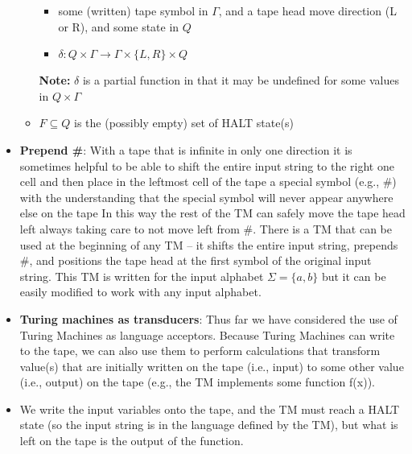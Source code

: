 \documentclass{report}
\begin{document}
\begin{itemize}
\begin{itemize}
\begin{itemize}
                        \item some (written) tape symbol in $\Gamma$, and a tape head move direction (L or R), and some state in $Q$
                        \item $\delta: Q \times \Gamma\to \Gamma \times \{L,R\} \times Q $
                    \end{itemize}
                    \bigbreak \noindent 
                    \textbf{Note:} $\delta$ is a partial function in that it may be undefined for some values in $Q \times \Gamma$
                \item $F \subseteq Q$ is the (possibly empty) set of HALT state(s)

            \end{itemize}
        \item \textbf{Prepend \#}: With a tape that is infinite in only one direction it is sometimes helpful to be able to shift the entire input string to the right one cell and then place in the leftmost cell of the tape a special symbol (e.g., \#) with the understanding that the special symbol will never appear anywhere else on the tape
            \bigbreak \noindent 
            In this way the rest of the TM can safely move the tape head left always taking care to not move left from \#.
            \bigbreak \noindent 
            There is a TM that can be used at the beginning of any TM – it shifts the entire input string, prepends \#, and positions the tape head at the first symbol of the original input string.
            \bigbreak \noindent 
            This TM is written for the input alphabet $\Sigma = \{a,b\}$ but it can be easily modified to work with any input alphabet.
            \bigbreak \noindent 
        \item \textbf{Turing machines as transducers}: 
            Thus far we have considered the use of Turing Machines as language acceptors.
            \bigbreak \noindent 
            Because Turing Machines can write to the tape, we can also use them to perform calculations that transform value(s) that are initially written on the tape (i.e., input) to some other value (i.e., output) on the tape (e.g., the TM implements some function f(x)).
            \bigbreak \noindent 
        \item We write the input variables onto the tape, and the TM must reach a HALT state (so the input string is in the language defined by the TM), but what is left on the tape is the output of the function.
            \bigbreak \noindent 

\end{itemize}
\end{document}
